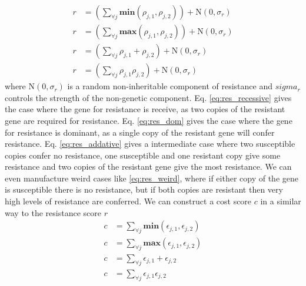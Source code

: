 \documentclass[12pt, a4paper]{article}
\begin{document}
\begin{subequations}
\label{eq:resist}
\begin{align}
	\label{eq:res_recessive}
	 r &= \left(\displaystyle\sum_{\forall j} \textbf{min}(\rho_{j,1}, \rho_{j, 2})\right) + \text{N}(0, \sigma_r)\\
	\label{eq:res_dom}
	r &= \left(\displaystyle\sum_{\forall j} \textbf{max}(\rho_{j,1}, \rho_{j, 2})\right) + \text{N}(0, \sigma_r)\\
	\label{eq:res_addative}
	r &= \left(\displaystyle\sum_{\forall j} \rho_{j,1} + \rho_{j,2}\right) + \text{N}(0, \sigma_r)\\
	\label{eq:res_weird}
	r &= \left(\displaystyle\sum_{\forall j} \rho_{j,1}\rho_{j,2}\right) + \text{N}(0, \sigma_r)	
	\end{align}
\end{subequations}
where $\text{N}(0, \sigma_r)$ is a random non-inheritable component of resistance and $sigma_r$ controls the strength of the non-genetic component. Eq. \ref{eq:res_recessive} gives the case where the gene for resistance is receive, as two copies of the resistant gene are required for resistance. Eq. \ref{eq:res_dom} gives the case where the gene for resistance is dominant, as a single copy of the resistant gene will confer resistance. Eq. \ref{eq:res_addative} gives a intermediate case where two susceptible copies confer no resistance, one susceptible and one resistant copy give some resistance and two copies of the resistant gene give the most resistance. We can even manufacture weird cases like \ref{eq:res_weird}, where if either copy of the gene is susceptible there is no resistance, but if both copies are resistant then very high levels of resistance are conferred. We can construct a cost score $c$ in a similar way to the resistance score $r$
\begin{subequations}
\label{eq:cost}
\begin{align}
	\label{eq:cost_recessive}
	c &= \displaystyle\sum_{\forall j} \textbf{min}(\epsilon_{j, 1}, \epsilon_{j, 2})\\
	\label{eq:cost_dom}
	c &= \displaystyle\sum_{\forall j} \textbf{max}(\epsilon_{j, 1}, \epsilon_{j, 2})\\
	\label{eq:cost_addative}
	c &= \displaystyle\sum_{\forall j} \epsilon_{j,1} + \epsilon_{j,2}\\
	\label{eq:cost_weird}
	c &= \displaystyle\sum_{\forall j} \epsilon_{j,1}\epsilon_{j,2}	
	\end{align}
\end{subequations}
        
\end{document}
